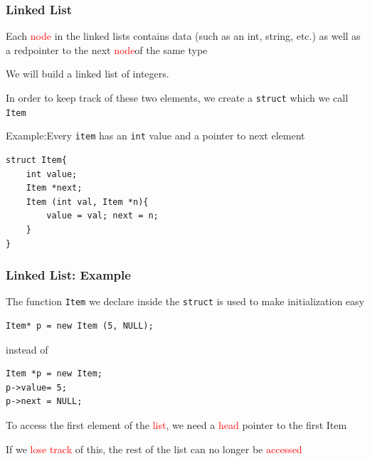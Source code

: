 \documentclass{beamer}
\newcommand{\red}[1]{\textcolor{red}{#1}}
\begin{document}
\begin{frame}[fragile]
\frametitle{Linked List}
Each \red{node} in the linked lists contains data (such as an int, string, etc.) as well as a red{pointer} to the
next \red{node}of the same type

\medskip

We will build a linked list of integers.

\medskip

In order to keep track of these two elements, we create a \verb|struct| which we call \verb|Item|

\begin{block}{Example:{Every \texttt{item} has an \texttt{int} value and a pointer to next element}}

\begin{verbatim}
struct Item{
    int value;
    Item *next;
    Item (int val, Item *n){ 
        value = val; next = n; 
    }
}
\end{verbatim}

\end{block}

\end{frame}
\begin{frame}[fragile]
\frametitle{Linked List: Example}
The function \verb|Item| we declare inside the \verb|struct| is used to make initialization easy

\begin{block}

\begin{verbatim}
Item* p = new Item (5, NULL);
\end{verbatim}

\end{block}

instead of 

\begin{block}

\begin{verbatim}
Item *p = new Item; 
p->value= 5; 
p->next = NULL;
\end{verbatim}

\end{block}

To access the first element of the \red{list}, we 
need a \red{head} pointer to the first Item

\medskip

If we \red{lose track} of this, the 
rest of the list can no longer be \red{accessed}

\end{frame}
\end{document}
